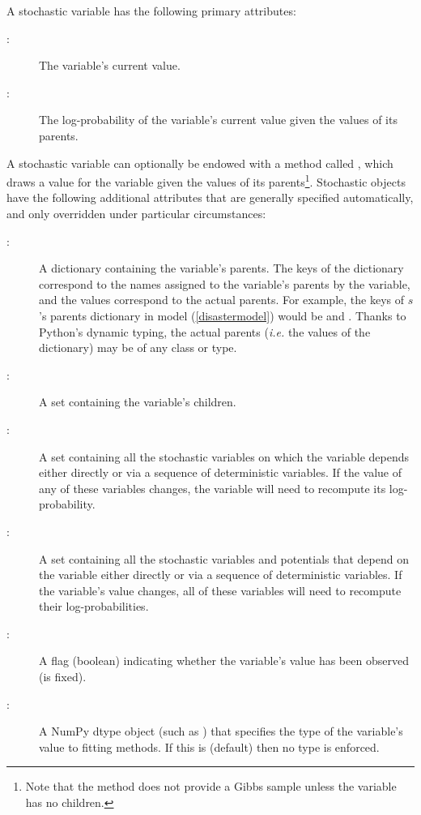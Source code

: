 A stochastic variable has the following primary attributes:
\begin{description}
    \item[:] The variable's current value.
    \item[:] The log-probability of the variable's current value given the values of its parents.
\end{description}
A stochastic variable can optionally be endowed with a method called , which draws a value for the variable given the values of its parents\footnote{Note that the  method does not provide a Gibbs sample unless the variable has no children.}. Stochastic objects have the following additional attributes that are generally specified automatically, and only overridden under particular circumstances:
\begin{description}
    \item[:] A dictionary containing the variable's parents. The keys of the dictionary correspond to the names assigned to the variable's parents by the variable, and the values correspond to the actual parents. For example, the keys of $s$'s parents dictionary in model (\ref{disastermodel}) would be  and . Thanks to Python's dynamic typing, the actual parents (\emph{i.e.} the values of the dictionary) may be of any class or type.
    \item[:] A set containing the variable's children.
    \item[:] A set containing all the stochastic variables on which the variable depends either directly or via a sequence of deterministic variables. If the value of any of these variables changes, the variable will need to recompute its log-probability.
    \item[:] A set containing all the stochastic variables and potentials that depend on the variable either directly or via a sequence of deterministic variables. If the variable's value changes, all of these variables will need to recompute their log-probabilities.
    \item[:] A flag (boolean) indicating whether the variable's value has been observed (is fixed).
    \item[:] A NumPy dtype object (such as ) that specifies the type of the variable's value to fitting methods. If this is  (default) then no type is enforced.
\end{description}

